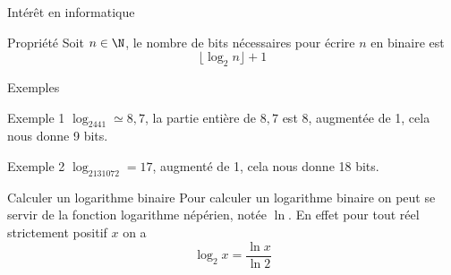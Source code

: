 \documentclass[10pt]{beamer}
\begin{document}
\begin{frame}{Intérêt en informatique}
\begin{alertblock}{Propriété}
Soit $n\in\N$, le nombre de bits nécessaires pour écrire $n$ en binaire est $$\lfloor\log_2 n\rfloor +1$$
\end{alertblock}
\end{frame}
\begin{frame}{Exemples}
\begin{exampleblock}{Exemple 1}
$\log_2441 \simeq 8,7$, la partie entière de $8,7$ est $8$, augmentée de 1, cela nous donne 9 bits.
\end{exampleblock}
\pause
\begin{exampleblock}{Exemple 2}
$\log_2131072 = 17$, augmenté de 1, cela nous donne 18 bits.
\end{exampleblock}
\end{frame}

\begin{frame}{Calculer un logarithme binaire}
Pour calculer un logarithme binaire on peut se servir de la fonction \alert{logarithme népérien}, notée $\ln$. En effet pour tout réel strictement positif $x$ on a $$\log_2 x = \dfrac{\ln x}{\ln 2}$$
\end{frame}
\end{document}
